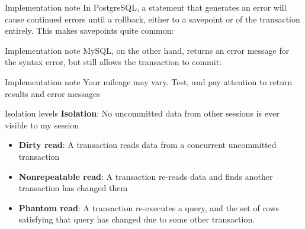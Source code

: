 \documentclass[svgnames]{beamer}
\begin{document}
\begin{frame}{Implementation note}
    In PostgreSQL, a statement that generates an error will cause continued
    errors until a rollback, either to a savepoint or of the transaction
    entirely. This makes savepoints quite common: \\
    \vspace{10pt}
    \small{
    }
\end{frame}

\begin{frame}{Implementation note}
    MySQL, on the other hand, returns an error message for the syntax error,
    but still allows the transaction to commit: \\
    \vspace{10pt}
    \small {
    }
\end{frame}

\begin{frame}{Implementation note}
    Your mileage may vary. Test, and pay attention to return results and error
    messages
\end{frame}

\begin{frame}{Isolation levels}
    \textbf{Isolation}: No uncommitted data from other sessions is ever visible to my session
    \begin{itemize}
        \item \textbf{Dirty read}: A transaction reads data from a
        concurrent uncommitted transaction
        \item \textbf{Nonrepeatable read}: A transaction re-reads data and
        finds another transaction has changed them
        \item \textbf{Phantom read}: A transaction re-executes a query, and
        the set of rows satisfying that query has changed due to some other
        transaction.
    \end{itemize}
\end{frame}
\end{document}
